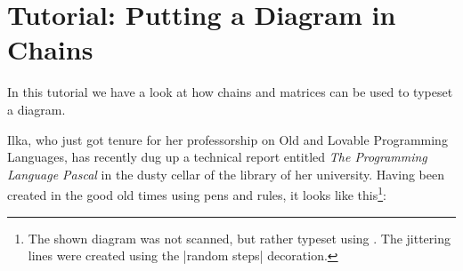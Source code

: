 %
%
%


\section{Tutorial: Putting a Diagram in Chains}

In this tutorial we have a look at how chains and matrices can be used
to typeset a diagram.

Ilka, who just got tenure for her professorship on Old and
Lovable Programming Languages, has recently dug up a technical report entitled
\emph{The Programming Language Pascal} in the dusty cellar of the
library of her university. Having been created in the good old times
using pens and rules, it looks like this\footnote{The shown diagram was not scanned, but
  rather typeset using \tikzname. The jittering lines were created
  using the |random steps| decoration.}:


